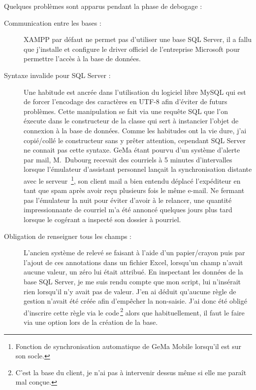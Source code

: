 Quelques problèmes sont apparus pendant la phase de debogage :
\begin{description}

  \item[Communication entre les bases :] XAMPP par défaut ne permet pas
    d'utiliser une base SQL Server, il a fallu que j'installe et
    configure le driver officiel de l'entreprise Microsoft pour
    permettre l'accès à la base de données.

  \item[Syntaxe invalide pour SQL Server :] Une habitude est ancrée dans
    l'utilisation du logiciel libre MySQL qui est de forcer l'encodage
    des caractères en UTF-8 afin d'éviter de futurs problèmes.  Cette
    manipulation se fait via une requête SQL que l'on éxecute dans le
    constructeur de la classe qui sert à instancier l'objet de connexion
    à la base de données. Comme les habitudes ont la vie dure, j'ai
    copié/collé le constructeur sans y prêter attention, cependant SQL
    Server ne connait pas cette syntaxe. GeMa étant pourvu d'un système
    d'alerte par mail, M.~Dubourg recevait des courriels à 5 minutes
    d'intervalles lorsque l'émulateur d'assistant personnel lançait la
    synchronisation distante avec le serveur\, \footnote{Fonction de
    synchronisation automatique de GeMa Mobile lorsqu'il est sur son
    socle.}, son client mail a bien entendu déplacé l'expéditeur en tant
    que spam après avoir reçu plusieurs fois le même e-mail.  Ne fermant
    pas l'émulateur la nuit pour éviter d'avoir à le relancer, une
    quantité impressionnante de courriel m'a été annoncé quelques jours
    plus tard lorsque le cogérant a inspecté son dossier à pourriel.

  \item[Obligation de renseigner tous les champs :] L'ancien système de
    relevé se faisant à l'aide d'un papier/crayon puis par l'ajout de
    ces annotations dans un fichier Excel, lorsqu'un champ n'avait
    aucune valeur, un zéro lui était attribué. En inspectant les données
    de la base SQL Server, je me suis rendu compte que mon script, lui
    n'insérait rien lorsqu'il n'y avait pas de valeur. J'en ai déduit
    qu'aucune règle de gestion n'avait été créée afin d'empêcher la
    non-saisie. J'ai donc été obligé d'inscrire cette règle via le
    code\,\footnote{C'est la base du client, je n'ai pas à intervenir
    dessus même si elle me paraît mal conçue.} alors que habituellement,
    il faut le faire via une option lors de la création de la base.

\end{description}
